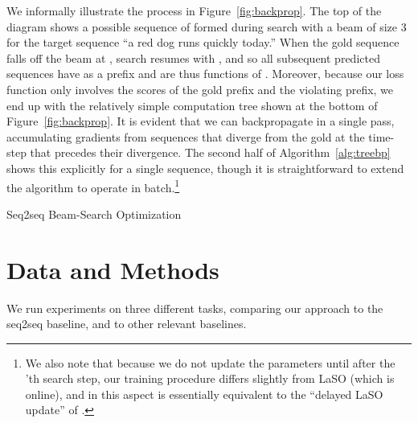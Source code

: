 \documentclass[11pt,letterpaper]{article}
\begin{document}
We informally illustrate the process in Figure~\ref{fig:backprop}. The
top of the diagram shows a possible sequence of 
formed during search with a beam of size 3 for the target sequence
 ``a red dog runs quickly today.'' When the gold sequence falls
off the beam at , search resumes with
, and so all subsequent predicted
sequences have  as a prefix and are thus functions of
. Moreover, because our loss function only involves the
scores of the gold prefix and the violating prefix, we end up with the
relatively simple computation tree shown at the bottom of
Figure~\ref{fig:backprop}. It is evident that we can backpropagate
in a single pass, accumulating gradients from sequences that diverge
from the gold at the time-step that precedes their divergence. The
second half of Algorithm~\ref{alg:treebp} shows this explicitly for a
single sequence, though it is straightforward to extend the algorithm
to operate in batch.\footnote{We also note that because
  we do not update the parameters until after the 'th search step, our training procedure
  differs slightly from LaSO (which is online), and in this aspect is
  essentially equivalent to the ``delayed LaSO update'' of .}
{\small
\begin{algorithm}[t!]
  \small
  \begin{algorithmic}[1]
    \State{; }
    \For{}
    \If{}  
    \State{}
    \State{}    
    \State{}
    \State{}
    \Else{}
    \State{}
    \EndIf{}
    
    \EndFor{}
\State{; }
    \For{}
    \State{
      }
    \State{
      }      

    \If{}
    \State{}     
    \State{ }
    \EndIf{}
    \EndFor{}
\EndProcedure{}
  \end{algorithmic}
  \caption{\label{alg:treebp} Seq2seq Beam-Search Optimization}
\end{algorithm}
}
  


 
 
  





 


\section{Data and Methods}
We run experiments on three different tasks, comparing our approach to
the seq2seq baseline, and to other relevant baselines.
\end{document}
